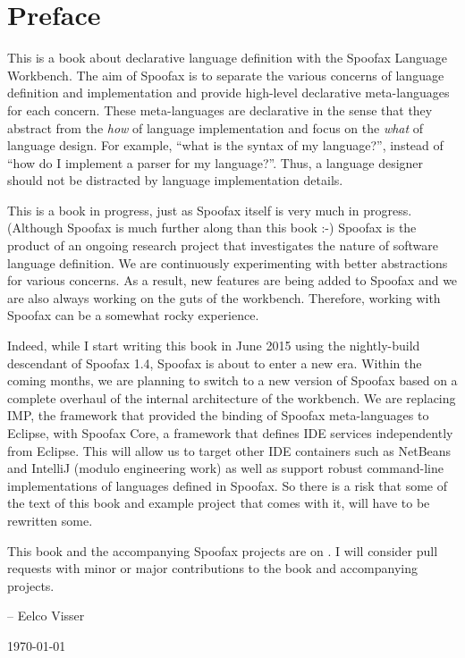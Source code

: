 \chapter*{Preface}

This is a book about declarative language definition with the Spoofax Language
Workbench.
The aim of Spoofax is to separate the various concerns of language definition
and implementation and provide high-level declarative meta-languages for each
concern.
These meta-languages are declarative in the sense that they abstract from the
\emph{how} of language implementation and focus on the \emph{what} of language
design.
For example, ``what is the syntax of my language?'', instead of ``how do I
implement a parser for my language?''.
Thus, a language designer should not be distracted by language implementation
details. 

This is a book in progress, just as Spoofax itself is very much in progress.
(Although Spoofax is much further along than this book :-) Spoofax is the
product of an ongoing research project that investigates the nature of software
language definition. We are continuously experimenting with better abstractions
for various concerns.
As a result, new features are being added to Spoofax and we are also always
working on the guts of the workbench.
Therefore, working with Spoofax can be a somewhat rocky experience.

Indeed, while I start writing this book in June 2015 using the nightly-build
descendant of Spoofax 1.4, Spoofax is about to enter a new era.
Within the coming months, we are planning to switch to a new version of Spoofax
based on a complete overhaul of the internal architecture of the workbench.
We are replacing IMP, the framework that provided the binding of Spoofax
meta-languages to Eclipse, with Spoofax Core, a framework that defines IDE
services independently from Eclipse. This will allow us to target other IDE
containers such as NetBeans and IntelliJ (modulo engineering work) as well as
support robust command-line implementations of languages defined in Spoofax. So
there is a risk that some of the text of this book and example project that
comes with it, will have to be rewritten some.

This book and the accompanying Spoofax projects are on . 
I will consider pull requests with minor or major contributions to the book
and accompanying projects.

-- Eelco Visser

\today

